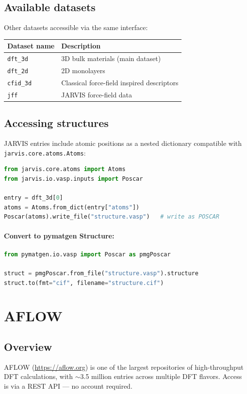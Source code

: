 \documentclass[11pt,a4paper]{article}
\begin{document}
\subsection{Available datasets}
Other datasets accessible via the same interface:
\begin{center}
\begin{tabular}{ll}
\toprule
Dataset name & Description \\
\midrule
\texttt{dft\_3d}   & 3D bulk materials (main dataset) \\
\texttt{dft\_2d}   & 2D monolayers \\
\texttt{cfid\_3d}  & Classical force-field inspired descriptors \\
\texttt{jff}       & JARVIS force-field data \\
\bottomrule
\end{tabular}
\end{center}

\subsection{Accessing structures}
JARVIS entries include atomic positions as a nested dictionary compatible with
\verb|jarvis.core.atoms.Atoms|:
\begin{lstlisting}[language=Python]
from jarvis.core.atoms import Atoms
from jarvis.io.vasp.inputs import Poscar

entry = dft_3d[0]
atoms = Atoms.from_dict(entry["atoms"])
Poscar(atoms).write_file("structure.vasp")   # write as POSCAR
\end{lstlisting}

\paragraph{Convert to pymatgen Structure:}
\begin{lstlisting}[language=Python]
from pymatgen.io.vasp import Poscar as pmgPoscar

struct = pmgPoscar.from_file("structure.vasp").structure
struct.to(fmt="cif", filename="structure.cif")
\end{lstlisting}

\section{AFLOW}

\subsection{Overview}
AFLOW (\url{https://aflow.org}) is one of the largest repositories of
high-throughput DFT calculations, with $\sim$3.5 million entries across
multiple DFT flavors. Access is via a REST API --- no account required.
\end{document}

